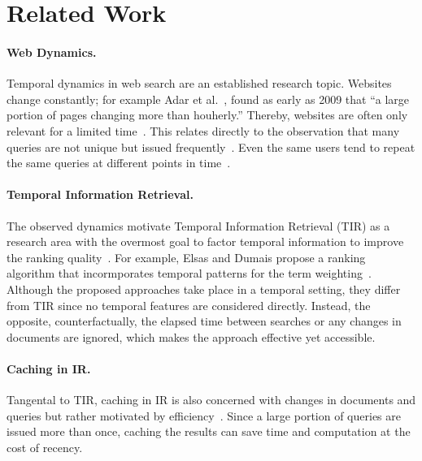 \section{Related Work}
\label{sec:related-work}

\paragraph{Web Dynamics.} Temporal dynamics in web search are an established research topic. Websites change constantly; for example Adar et al.~\cite{DBLP:conf/wsdm/AdarTDE09}, found as early as 2009 that ``a large portion of pages changing more than houherly.'' Thereby, websites are often only relevant for a limited time~\cite{DBLP:conf/sigir/TikhonovBBOKG13}. This relates directly to the observation that many queries are not unique but issued frequently~\cite{DBLP:conf/sigir/Dumais14,DBLP:journals/sigir/SilversteinHMM99}. Even the same users tend to repeat the same queries at different points in time~\cite{DBLP:conf/wsdm/TylerT10}.

\paragraph{Temporal Information Retrieval.} The observed dynamics motivate Temporal Information Retrieval (TIR) as a research area with the overmost goal to factor temporal information to improve the ranking quality~\cite{DBLP:journals/ftir/KanhabuaBN15,DBLP:journals/csur/CamposDJJ14}. For example, Elsas and Dumais propose a ranking algorithm that incormporates temporal patterns for the term weighting~\cite{DBLP:conf/wsdm/ElsasD10}. Although the proposed approaches take place in a temporal setting, they differ from TIR since no temporal features are considered directly. Instead, the opposite, counterfactually, the elapsed time between searches or any changes in documents are ignored, which makes the approach effective yet accessible.

\paragraph{Caching in IR.} Tangental to TIR, caching in IR is also concerned with changes in documents and queries but rather motivated by efficiency~\cite{DBLP:conf/www/CambazogluJPBCLB10,DBLP:conf/sigir/Baeza-YatesGJMPS07}. Since a large portion of queries are issued more than once, caching the results can save time and computation at the cost of recency.


